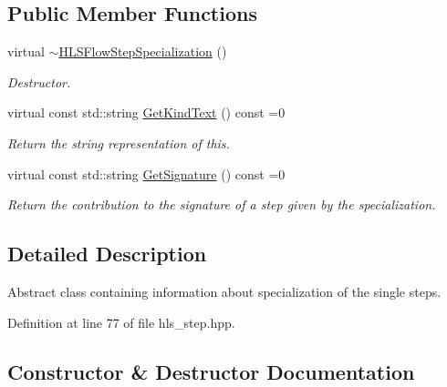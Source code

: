\subsection*{Public Member Functions}
\begin{DoxyCompactItemize}
\item 
virtual \hyperlink{classHLSFlowStepSpecialization_a1ee7aa4c2fd9e2e7e4b063d738e173bc}{$\sim$\+H\+L\+S\+Flow\+Step\+Specialization} ()
\begin{DoxyCompactList}\small\item\em Destructor. \end{DoxyCompactList}\item 
virtual const std\+::string \hyperlink{classHLSFlowStepSpecialization_abcad0108fa726ac69986e26671a75ec3}{Get\+Kind\+Text} () const =0
\begin{DoxyCompactList}\small\item\em Return the string representation of this. \end{DoxyCompactList}\item 
virtual const std\+::string \hyperlink{classHLSFlowStepSpecialization_ae8c6ce8a3495c93e8a8edc01d8727023}{Get\+Signature} () const =0
\begin{DoxyCompactList}\small\item\em Return the contribution to the signature of a step given by the specialization. \end{DoxyCompactList}\end{DoxyCompactItemize}


\subsection{Detailed Description}
Abstract class containing information about specialization of the single steps. 

Definition at line 77 of file hls\+\_\+step.\+hpp.



\subsection{Constructor \& Destructor Documentation}
\mbox{\label{classHLSFlowStepSpecialization_a1ee7aa4c2fd9e2e7e4b063d738e173bc}} 
